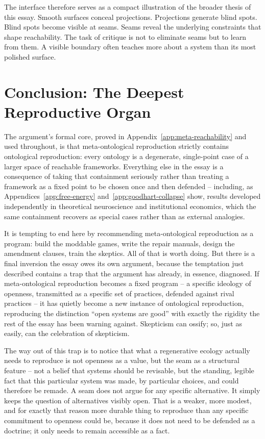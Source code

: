 \documentclass[11pt]{article}
\theoremstyle{plain}
\begin{document}
The interface therefore serves as a compact illustration of the broader thesis of this essay. Smooth surfaces conceal projections. Projections generate blind spots. Blind spots become visible at seams. Seams reveal the underlying constraints that shape reachability. The task of critique is not to eliminate seams but to learn from them. A visible boundary often teaches more about a system than its most polished surface.

\section{Conclusion: The Deepest Reproductive Organ}
\label{sec:conclusion}

The argument's formal core, proved in Appendix~\ref{app:meta-reachability} and used throughout, is that meta-ontological reproduction strictly contains ontological reproduction: every ontology is a degenerate, single-point case of a larger space of reachable frameworks. Everything else in the essay is a consequence of taking that containment seriously rather than treating a framework as a fixed point to be chosen once and then defended -- including, as Appendices~\ref{app:free-energy} and~\ref{app:goodhart-collapse} show, results developed independently in theoretical neuroscience and institutional economics, which the same containment recovers as special cases rather than as external analogies.

It is tempting to end here by recommending meta-ontological reproduction as a program: build the moddable games, write the repair manuals, design the amendment clauses, train the skeptics. All of that is worth doing. But there is a final inversion the essay owes its own argument, because the temptation just described contains a trap that the argument has already, in essence, diagnosed. If meta-ontological reproduction becomes a fixed program -- a specific ideology of openness, transmitted as a specific set of practices, defended against rival practices -- it has quietly become a new instance of ontological reproduction, reproducing the distinction ``open systems are good'' with exactly the rigidity the rest of the essay has been warning against. Skepticism can ossify; so, just as easily, can the celebration of skepticism.

The way out of this trap is to notice that what a regenerative ecology actually needs to reproduce is not openness as a value, but the seam as a structural feature -- not a belief that systems should be revisable, but the standing, legible fact that this particular system was made, by particular choices, and could therefore be remade. A seam does not argue for any specific alternative. It simply keeps the question of alternatives visibly open. That is a weaker, more modest, and for exactly that reason more durable thing to reproduce than any specific commitment to openness could be, because it does not need to be defended as a doctrine; it only needs to remain accessible as a fact.
\end{document}
